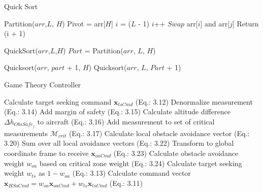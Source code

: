 \documentclass[a4paper,11pt]{article}
\begin{document}
 
\begin{algorithm}
	\caption{Quick Sort} 
	\begin{algorithmic}[2]
 
            \State Partition($arr$,$L$, $H$)
            \State Pivot = arr[$H$]
            \State $i$ = ($L$ - 1)
            \State $i$++
            \State $Swap$ arr[$i$] and arr[$j$]
            \State Return (i + 1)


            \State QuickSort($arr$,$L$,$H$)
            \State $Part$ = Partition($arr$, $L$, $H$)
		
            \State Quicksort($arr$, $part$ + 1, $H$)
            \State Quicksort($arr$, $L$, $Part$ + 1)

   

		\EndFor
	\end{algorithmic} 
\end{algorithm}

\begin{algorithm}
	\caption{Game Theory Controller}
	\begin{algorithmic}[1]
		\State Calculate target seeking command $\mathbf{x}_{tsCmd}$ (Eq.: 3.12)
		\State Denormalize measurement (Eq.: 3.14)
		\State Add margin of safety (Eq.: 3.15)
		\State Calculate altitude difference $\Delta h_{ObsSafe_{j}}$ to aircraft (Eq.: 3.16)
		\State Add measurement to set of critical measurements $\mathcal{M}_{crit}$ (Eq.: 3.17)
		\EndIf
		\EndFor
		\State Calculate local obstacle avoidance vector (Eq.: 3.20)
		\EndFor
		\State Sum over all local avoidance vectors (Eq.: 3.22)
		\State Transform to global coordinate frame to receive $\mathbf{x}_{oaCmd}$ (Eq.: 3.23)
		\State Calculate obstacle avoidance weight $w_{oa}$ based on critical zone weight (Eq.: 3.24)
		\State Calculate target seeking weight $w_{ts}$ as $1-w_{oa}$ (Eq.: 3.13)
		\State Calculate command vector $\mathbf{x}_{HSaCmd}=w_{oa}\mathbf{x}_{oaCmd}+w_{ts}\mathbf{x}_{tsCmd}$ (Eq.: 3.11)
		\EndFor
	\end{algorithmic} 
\end{algorithm} 
\end{document}
